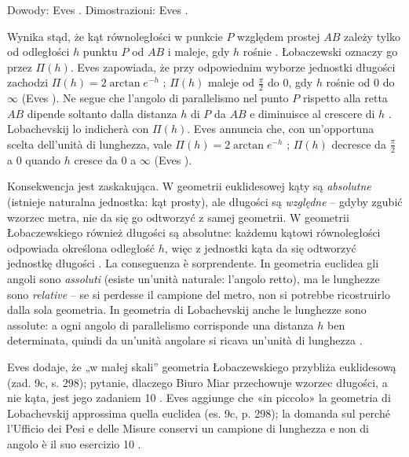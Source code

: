 Dowody: Eves \cite[s. 295--296]{eves1_1972}. %
Dimostrazioni: Eves \cite[p. 295--296]{eves1_1972}. %

Wynika stąd, że kąt równoległości w punkcie $P$ względem prostej $AB$ zależy tylko od odległości $h$ punktu $P$ od $AB$ i maleje, gdy $h$ rośnie \cite[s. 296--297]{eves1_1972}. %
Łobaczewski oznaczy go przez $\Pi(h)$. %
Eves zapowiada, że przy odpowiednim wyborze jednostki długości zachodzi $\Pi(h) = 2\arctan e^{-h}$ \cite[s. 297]{eves1_1972}; $\Pi(h)$ maleje od $\tfrac{\pi}{2}$ do $0$, gdy $h$ rośnie od $0$ do $\infty$ (Eves \cite[s. 298, zad. 9]{eves1_1972}). %
Ne segue che l'angolo di parallelismo nel punto $P$ rispetto alla retta $AB$ dipende soltanto dalla distanza $h$ di $P$ da $AB$ e diminuisce al crescere di $h$ \cite[p. 296--297]{eves1_1972}. %
Lobachevskij lo indicherà con $\Pi(h)$. %
Eves annuncia che, con un'opportuna scelta dell'unità di lunghezza, vale $\Pi(h) = 2\arctan e^{-h}$ \cite[p. 297]{eves1_1972}; $\Pi(h)$ decresce da $\tfrac{\pi}{2}$ a $0$ quando $h$ cresce da $0$ a $\infty$ (Eves \cite[p. 298, es. 9]{eves1_1972}). %

Konsekwencja jest zaskakująca. %
W geometrii euklidesowej kąty są \emph{absolutne} (istnieje naturalna jednostka: kąt prosty), ale długości są \emph{względne} -- gdyby zgubić wzorzec metra, nie da się go odtworzyć z samej geometrii. %
W geometrii Łobaczewskiego również długości są absolutne: każdemu kątowi równoległości odpowiada określona odległość $h$, więc z jednostki kąta da się odtworzyć jednostkę długości \cite[s. 297]{eves1_1972}. %
La conseguenza è sorprendente. %
In geometria euclidea gli angoli sono \emph{assoluti} (esiste un'unità naturale: l'angolo retto), ma le lunghezze sono \emph{relative} -- se si perdesse il campione del metro, non si potrebbe ricostruirlo dalla sola geometria. %
In geometria di Lobachevskij anche le lunghezze sono assolute: a ogni angolo di parallelismo corrisponde una distanza $h$ ben determinata, quindi da un'unità angolare si ricava un'unità di lunghezza \cite[p. 297]{eves1_1972}. %

Eves dodaje, że „w małej skali'' geometria Łobaczewskiego przybliża euklidesową (zad. 9c, s. 298); pytanie, dlaczego Biuro Miar przechowuje wzorzec długości, a nie kąta, jest jego zadaniem 10 \cite[s. 298]{eves1_1972}. %
Eves aggiunge che «in piccolo» la geometria di Lobachevskij approssima quella euclidea (es. 9c, p. 298); la domanda sul perché l'Ufficio dei Pesi e delle Misure conservi un campione di lunghezza e non di angolo è il suo esercizio 10 \cite[p. 298]{eves1_1972}. %
